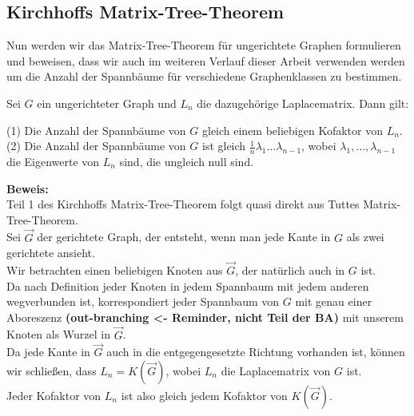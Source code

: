 \subsection{Kirchhoffs Matrix-Tree-Theorem}
Nun werden wir das Matrix-Tree-Theorem für ungerichtete Graphen formulieren und beweisen, dass wir auch im weiteren Verlauf dieser Arbeit verwenden werden um die Anzahl der Spannbäume für verschiedene Graphenklassen zu bestimmen.
\begin{Tms}
Sei $G$ ein ungerichteter Graph und $L_n$  die dazugehörige Laplacematrix. 
Dann gilt:
\par
\begingroup
\leftskip=20pt%
\rightskip=20pt
\noindent %
(1) Die Anzahl der Spannbäume von $G$ gleich einem beliebigen Kofaktor von $L_n$.\\
(2) Die Anzahl der Spannbäume von $G$ ist gleich $\frac{1}{n}\lambda_1\ldots\lambda_{n-1}$, wobei $\lambda_1,\ldots,\lambda_{n-1}$ die Eigenwerte von $L_n$ sind, die ungleich null sind.
\par
\endgroup
\end{Tms}
\textbf{Beweis:}\\
Teil 1 des Kirchhoffs Matrix-Tree-Theorem folgt quasi direkt aus Tuttes Matrix-Tree-Theorem. \\
Sei $\vec{G}$ der gerichtete Graph, der entsteht, wenn man jede Kante in $G$ als zwei gerichtete ansieht.\\
Wir betrachten einen beliebigen Knoten aus $\vec{G}$, der natürlich auch in $G$ ist. \\
Da nach Definition jeder Knoten in jedem Spannbaum mit jedem anderen wegverbunden ist, korrespondiert jeder Spannbaum von $G$ mit genau einer Aboreszenz \textbf{(out-branching <- Reminder, nicht Teil der BA)} mit unserem Knoten als Wurzel in $\vec{G}$. \\
Da jede Kante in $\vec{G}$ auch in die entgegengesetzte Richtung vorhanden ist, können wir schließen, dass $L_n=K(\vec{G})$, wobei $L_n$ die Laplacematrix von $G$ ist. \\
Jeder Kofaktor von $L_n$ ist also gleich jedem Kofaktor von $K(\vec{G})$.\\
